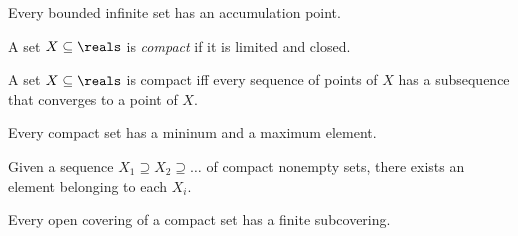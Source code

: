 \begin{theorem}
	Every bounded infinite set has an accumulation point.
\end{theorem}

\begin{definition}
	A set $X\subseteq \reals$ is \emph{compact} if it is limited and closed.
\end{definition}

\begin{theorem}
	A set $X \subseteq \reals$ is compact iff every sequence of points of $X$ has a subsequence that converges to a point of $X$.
\end{theorem}

\begin{fact}
	Every compact set has a mininum and a maximum element.
\end{fact}

\begin{theorem}
	Given a sequence $X_1 \supseteq X_2 \supseteq \dots$ of compact nonempty sets, there exists an element belonging to each $X_i$.
\end{theorem}


\begin{theorem}
	Every open covering of a compact set has a finite subcovering.
\end{theorem}
